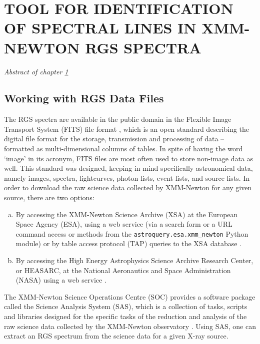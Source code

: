 \chapter{TOOL FOR IDENTIFICATION OF SPECTRAL LINES IN XMM-NEWTON RGS SPECTRA} \label{chap:tool}
    \minitoc
    \emph{Abstract of chapter \ref{chap:tool}}
    
    \section{Working with RGS Data Files} \label{tool:rgs-files}
        The RGS spectra are available in the public domain in the Flexible Image Transport System (FITS) file format \cite{chiappetti2018definition}, which is an open standard describing the digital file format for the storage, transmission and processing of data – formatted as multi-dimensional columns of tables. In spite of having the word ‘image’ in its acronym, FITS files are most often used to store non-image data as well. This standard was designed, keeping in mind specifically astronomical data, namely images, spectra, lightcurves, photon lists, event lists, and source lists. In order to download the raw science data collected by XMM-Newton for any given source, there are two options:
        \begin{enumerate}[a)]
            \item By accessing the XMM-Newton Science Archive (XSA) at the European Space Agency (ESA), using a web service (via a search form or a URL command access or methods from the \texttt{astroquery.esa.xmm\_newton} Python module) or by  table access protocol (TAP) queries to the XSA database \cite{arviset2002xmm}.
            
            \item By accessing the High Energy Astrophysics Science Archive Research Center, or HEASARC, at the National Aeronautics and Space Administration (NASA) using a web service \cite{barrett1993heasarc}.
        \end{enumerate}
        
        The XMM-Newton Science Operations Centre (SOC) provides a software package called the Science Analysis System (SAS), which is a collection of tasks, scripts and libraries designed for the specific tasks of the reduction and analysis of the raw science data collected by the XMM-Newton observatory \cite{de2019users}. Using SAS, one can extract an RGS spectrum from the science data for a given X-ray source.
        
